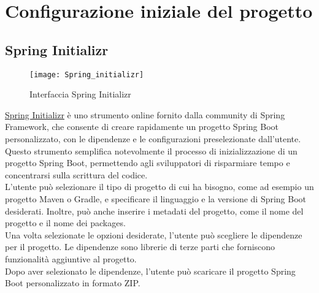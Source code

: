 \section{Configurazione iniziale del progetto}
\subsection{Spring Initializr}

\begin{figure}[!h] 
    \centering 
    \texttt{[image: Spring\_initializr]} 
    \caption{Interfaccia Spring Initializr}
\end{figure}

\noindent \href{https://start.spring.io/}{Spring Initializr} è uno strumento online fornito dalla community di Spring Framework, che consente di creare rapidamente un progetto Spring Boot personalizzato, con le dipendenze e le configurazioni preselezionate dall'utente. Questo strumento semplifica notevolmente il processo di inizializzazione di un progetto Spring Boot, permettendo agli sviluppatori di risparmiare tempo e concentrarsi sulla scrittura del codice.\\
L'utente può selezionare il tipo di progetto di cui ha bisogno, come ad esempio un progetto Maven o Gradle, e specificare il linguaggio e la versione di Spring Boot desiderati. Inoltre, può anche inserire i metadati del progetto, come il nome del progetto e il nome dei packages.\\
Una volta selezionate le opzioni desiderate, l'utente può scegliere le dipendenze per il progetto. Le dipendenze sono librerie di terze parti che forniscono funzionalità aggiuntive al progetto.\\
Dopo aver selezionato le dipendenze, l'utente può scaricare il progetto Spring Boot personalizzato in formato ZIP. 

